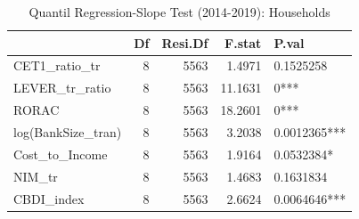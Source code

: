 \begin{table}[ht]
\centering
\caption{Quantil Regression-Slope Test (2014-2019): Households} 
\begingroup\small
\begin{tabular}{lrrrl}
  \toprule
 & Df & Resi.Df & F.stat & P.val \\ 
  \midrule
CET1\_ratio\_tr & 8 & 5563 & 1.4971 & 0.1525258 \\ 
  LEVER\_tr\_ratio & 8 & 5563 & 11.1631 & 0*** \\ 
  RORAC & 8 & 5563 & 18.2601 & 0*** \\ 
  log(BankSize\_tran) & 8 & 5563 & 3.2038 & 0.0012365*** \\ 
  Cost\_to\_Income & 8 & 5563 & 1.9164 & 0.0532384* \\ 
  NIM\_tr & 8 & 5563 & 1.4683 & 0.1631834 \\ 
  CBDI\_index & 8 & 5563 & 2.6624 & 0.0064646*** \\ 
   \bottomrule
\end{tabular}
\endgroup
\end{table}
